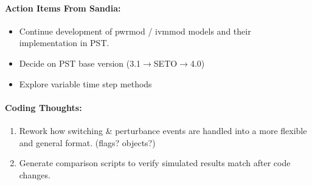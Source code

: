 \documentclass[12pt]{article}
\begin{document}
\begin{multicols}{2}
\paragraph{Action Items From Sandia:}
	\begin{itemize}
		\itemsep 0em 
			\item Continue development of pwrmod / ivmmod models and their implementation in PST.
			\item Decide on PST base version (3.1$\longrightarrow$SETO$\longrightarrow$4.0)
			\item Explore variable time step methods
	\end{itemize}
	

\vfill\null
\columnbreak

\paragraph{Coding Thoughts:} 
	\begin{enumerate}

		\itemsep 0em 
		\item Rework how switching \& perturbance events are handled into a more flexible and general format. (flags? objects?)
		\item Generate comparison scripts to verify simulated results match after code changes.
		


\end{enumerate}
\end{multicols}
\end{document}

